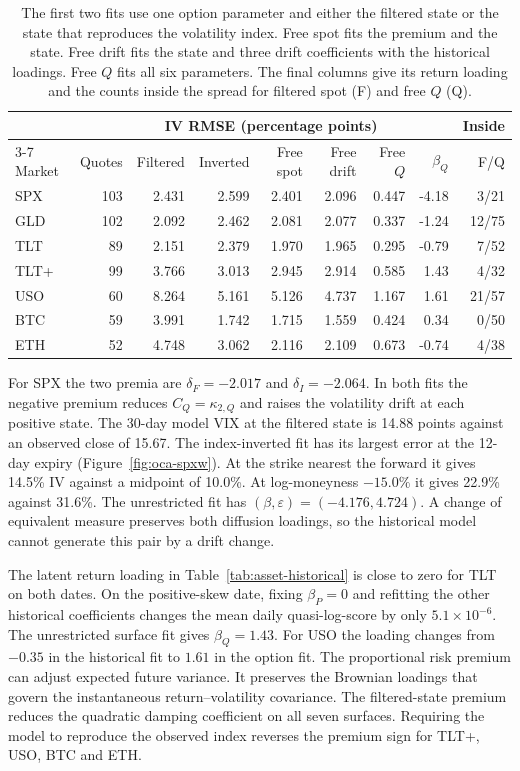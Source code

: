 \documentclass[11pt,a4paper]{article}
\theoremstyle{definition}
\theoremstyle{remark}
\begin{document}
\begin{table}[htbp]\centering\small
\setlength{\tabcolsep}{3.6pt}
\begin{tabular}{@{}lrrrrrrrr@{}}\toprule
 & & \multicolumn{5}{c}{IV RMSE (percentage points)} & & Inside\\
\cmidrule(lr){3-7}
Market & Quotes & Filtered & Inverted & Free spot & Free drift & Free $Q$ &
$\beta_Q$ & F/Q\\\midrule
SPX & 103 & 2.431 & 2.599 & 2.401 & 2.096 & 0.447 & -4.18 & 3/21 \\
GLD & 102 & 2.092 & 2.462 & 2.081 & 2.077 & 0.337 & -1.24 & 12/75 \\
TLT & 89 & 2.151 & 2.379 & 1.970 & 1.965 & 0.295 & -0.79 & 7/52 \\
TLT+ & 99 & 3.766 & 3.013 & 2.945 & 2.914 & 0.585 & 1.43 & 4/32 \\
USO & 60 & 8.264 & 5.161 & 5.126 & 4.737 & 1.167 & 1.61 & 21/57 \\
BTC & 59 & 3.991 & 1.742 & 1.715 & 1.559 & 0.424 & 0.34 & 0/50 \\
ETH & 52 & 4.748 & 3.062 & 2.116 & 2.109 & 0.673 & -0.74 & 4/38 \\
\bottomrule\end{tabular}
\caption{The first two fits use one option parameter and either the filtered state or
the state that reproduces the volatility index. Free spot fits the premium and the state.
Free drift fits the state and three drift coefficients with the historical loadings.
Free $Q$ fits all six parameters. The final columns give its return loading and the
counts inside the spread for filtered spot (F) and free $Q$ (Q).}
\label{tab:asset-premia}\end{table}

For SPX the two premia are $\delta_F=-2.017$ and
$\delta_I=-2.064$.
In both fits the negative premium reduces $C_Q=\kappa_{2,Q}$ and raises the volatility
drift at each positive state.
The 30-day model VIX at the filtered state is 14.88 points
against an observed close of 15.67.
The index-inverted fit has its largest error at the 12-day expiry
(Figure~\ref{fig:oca-spxw}).
At the strike nearest the forward it gives 14.5\%
IV against a midpoint of 10.0\%. At log-moneyness
$-15.0\%$ it gives 22.9\% against
31.6\%.
The unrestricted fit has $(\beta,\varepsilon)=(-4.176,
4.724)$. A change of equivalent measure preserves
both diffusion loadings, so the historical model cannot generate this pair by a drift change.

The latent return loading in Table~\ref{tab:asset-historical} is close to zero
for TLT on both dates. On the positive-skew date, fixing $\beta_P=0$ and refitting
the other historical coefficients changes the mean daily quasi-log-score by only
$5.1\times10^{-6}$.
The unrestricted surface fit gives $\beta_Q=1.43$.
For USO the loading changes from $-0.35$ in the
historical fit to $1.61$ in the option fit.
The proportional risk premium can adjust expected future variance. It preserves
the Brownian loadings that govern the instantaneous return--volatility covariance.
The filtered-state premium reduces the quadratic damping coefficient on all seven surfaces. Requiring the model to reproduce the observed index reverses the premium sign for TLT+, USO, BTC and ETH.
\end{document}
